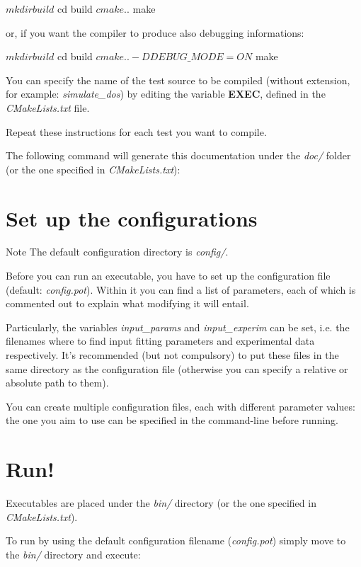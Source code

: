 \begin{DoxyCode}
$ mkdir build
$ cd build
$ cmake ..
$ make
\end{DoxyCode}


or, if you want the compiler to produce also debugging informations\-:


\begin{DoxyCode}
$ mkdir build
$ cd build
$ cmake .. -DDEBUG\_MODE=ON
$ make
\end{DoxyCode}


You can specify the name of the test source to be compiled (without extension, for example\-: {\itshape simulate\-\_\-dos}) by editing the variable {\bfseries E\-X\-E\-C}, defined in the {\itshape C\-Make\-Lists.\-txt} file.

Repeat these instructions for each test you want to compile.

The following command will generate this documentation under the {\itshape doc/} folder (or the one specified in {\itshape C\-Make\-Lists.\-txt})\-:


\hypertarget{index_configure}{}\section{Set up the configurations}\label{index_configure}
\begin{DoxyNote}{Note}
The default configuration directory is {\itshape config/}.
\end{DoxyNote}
Before you can run an executable, you have to set up the configuration file (default\-: {\itshape config.\-pot}). Within it you can find a list of parameters, each of which is commented out to explain what modifying it will entail. \par
Particularly, the variables {\itshape input\-\_\-params} and {\itshape input\-\_\-experim} can be set, i.\-e. the filenames where to find input fitting parameters and experimental data respectively. It's recommended (but not compulsory) to put these files in the same directory as the configuration file (otherwise you can specify a relative or absolute path to them). \par
\par
You can create multiple configuration files, each with different parameter values\-: the one you aim to use can be specified in the command-\/line before running.\hypertarget{index_run}{}\section{Run!}\label{index_run}
Executables are placed under the {\itshape bin/} directory (or the one specified in {\itshape C\-Make\-Lists.\-txt}). \par
\par
To run by using the default configuration filename ({\itshape config.\-pot}) simply move to the {\itshape bin/} directory and execute\-:


